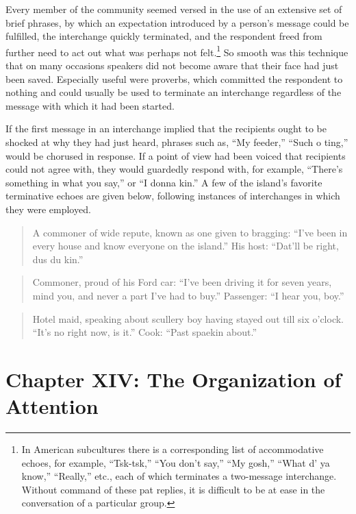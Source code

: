\documentclass[openany,nobib]{tufte-book}
\let\oldchapter\chapter
\def\chapter{%
  \setcounter{footnote}{0}%
  \oldchapter
}
\begin{document}
Every member of the community seemed versed in the use of an extensive
set of brief phrases, by which an expectation introduced by a person's
message could be fulfilled, the interchange quickly terminated, and the
respondent freed from further need to act out what was perhaps not
felt.\footnote{In American subcultures there is a corresponding list of
  accommodative echoes, for example, ``Tsk-tsk,'' ``You don't say,''
  ``My gosh,'' ``What d' ya know,'' ``Really,'' etc., each of which
  terminates a two-message interchange. Without command of these pat
  replies, it is difficult to be at ease in the conversation of a
  particular group.} So smooth was this technique that on many occasions
speakers did not become aware that their face had just been saved.
Especially useful were proverbs, which committed the respondent to
nothing and could usually be used to terminate an interchange regardless
of the message with which it had been started.

If the first message in an interchange implied that the recipients ought
to be shocked at why they had just heard, phrases such as, ``My
feeder,'' ``Such o ting,'' would be chorused in response. If a point of
view had been voiced that recipients could not agree with, they would
guardedly respond with, for example, ``There's something in what you
say,'' or ``I donna kin.'' A few of the island's favorite terminative
echoes are given below, following instances of interchanges in which
they were employed.

\begin{quote}
A commoner of wide repute, known as one given to bragging: ``I've been
in every house and know everyone on the island.'' His host: ``Dat'll be
right, dus du kin.''
\end{quote}

\begin{quote}
Commoner, proud of his Ford car: ``I've been driving it for seven years,
mind you, and never a part I've had to buy.'' Passenger: ``I hear you,
boy.''
\end{quote}

\begin{quote}
Hotel maid, speaking about scullery boy having stayed out till six
o'clock. ``It's no right now, is it.'' Cook: ``Past spaekin about.''
\end{quote}

\chapter[CHAPTER XIV: THE ORGANIZATION OF ATTENTION]{Chapter XIV: The Organization of Attention}
\label{ch:Chapter XIV: The Organization of Attention}
\end{document}
